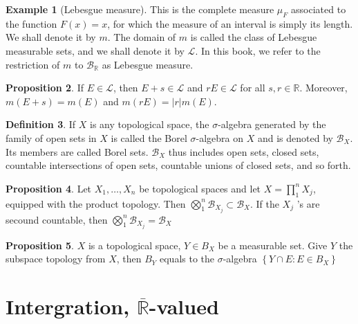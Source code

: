 \documentclass[12pt,a4paper]{book}
\newcommand{\bbrace}[1]{\left\{ #1 \right\} }
\newcommand{\bb}[1]{\mathbb{#1}}
\theoremstyle{definition}
\newtheorem{defn}{Definition}[section]
\newtheorem{prop}[defn]{Proposition}
\newtheorem{exam}[defn]{Example}
\begin{document}
\begin{exam}[Lebesgue measure]
    This is the complete measure $\mu_F$ associated to the function $F(x)=x$, for which the measure of an interval is simply its length. We shall denote it by $m$. The domain of $m$ is called the class of Lebesgue measurable sets, and we shall denote it by $\mathcal{L}$. 
    In this book, we refer to the restriction of $m$ to $\mathcal{B}_{\mathbb{R}}$ as Lebesgue measure.
\end{exam}
\begin{prop}
    If $E \in \mathcal{L}$, then $E+s \in \mathcal{L}$ and $r E \in \mathcal{L}$ for all $s, r \in \mathbb{R}$. Moreover, $m(E+s)=m(E)$ and $m(r E)=|r| m(E)$.
\end{prop}


\begin{defn}
    If $X$ is any topological space, the $\sigma$-algebra generated by the family of open sets in $X$ is called the Borel $\sigma$-algebra on $X$ and is denoted by $\mathcal{B}_X$. Its members are called Borel sets. $\mathcal{B}_X$ thus includes open sets, closed sets, countable intersections of open sets, countable unions of closed sets, and so forth.
\end{defn}
\begin{prop}
    Let $X_1, \ldots, X_n$ be topological spaces and let $X=\prod_1^n X_j$, equipped with the product topology. Then $\bigotimes_1^n \mathcal{B}_{X_j} \subset \mathcal{B}_X$. If the $X_j$ 's are secound countable, then $\bigotimes_1^n \mathcal{B}_{X_j}=\mathcal{B}_X$
\end{prop}
\begin{prop}
    $X$ is a topological space, $Y\in B_X$ be a measurable set. Give $Y$ the subspace topology from $X$, then $B_Y$ equals to the $\sigma$-algebra $\bbrace{Y\cap E: E\in B_X}$
\end{prop}


\newpage
\section{Intergration, $\overline{\bb{R}}$-valued}
\end{document}
